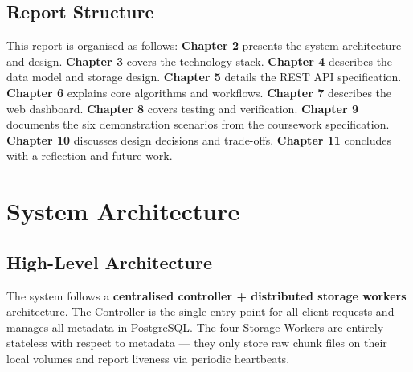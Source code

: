 \documentclass[12pt,a4paper]{report}
\begin{document}
\section{Report Structure}

This report is organised as follows:
\textbf{Chapter 2} presents the system architecture and design.
\textbf{Chapter 3} covers the technology stack.
\textbf{Chapter 4} describes the data model and storage design.
\textbf{Chapter 5} details the REST API specification.
\textbf{Chapter 6} explains core algorithms and workflows.
\textbf{Chapter 7} describes the web dashboard.
\textbf{Chapter 8} covers testing and verification.
\textbf{Chapter 9} documents the six demonstration scenarios from the coursework specification.
\textbf{Chapter 10} discusses design decisions and trade-offs.
\textbf{Chapter 11} concludes with a reflection and future work.

\chapter{System Architecture}

\section{High-Level Architecture}

The system follows a \textbf{centralised controller + distributed storage workers} architecture. The Controller is the single entry point for all client requests and manages all metadata in PostgreSQL. The four Storage Workers are entirely stateless with respect to metadata --- they only store raw chunk files on their local volumes and report liveness via periodic heartbeats.
\end{document}
